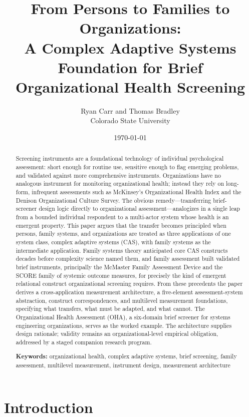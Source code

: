 \documentclass[12pt, letterpaper]{article}
\title{From Persons to Families to Organizations:\\A Complex Adaptive Systems Foundation for Brief Organizational Health Screening}
\author{Ryan Carr and Thomas Bradley\\Colorado State University}
\date{\today}
\begin{document}
\maketitle

\begin{abstract}
\noindent Screening instruments are a foundational technology of individual psychological assessment: short enough for routine use, sensitive enough to flag emerging problems, and validated against more comprehensive instruments. Organizations have no analogous instrument for monitoring organizational health; instead they rely on long-form, infrequent assessments such as McKinsey's Organizational Health Index and the Denison Organizational Culture Survey. The obvious remedy---transferring brief-screener design logic directly to organizational assessment---analogizes in a single leap from a bounded individual respondent to a multi-actor system whose health is an emergent property. This paper argues that the transfer becomes principled when persons, family systems, and organizations are treated as three applications of one system class, complex adaptive systems (CAS), with family systems as the intermediate application. Family systems theory anticipated core CAS constructs decades before complexity science named them, and family assessment built validated brief instruments, principally the McMaster Family Assessment Device and the SCORE family of systemic outcome measures, for precisely the kind of emergent relational construct organizational screening requires. From these precedents the paper derives a cross-application measurement architecture, a five-element assessment-system abstraction, construct correspondences, and multilevel measurement foundations, specifying what transfers, what must be adapted, and what cannot. The Organizational Health Assessment (OHA), a six-domain brief screener for systems engineering organizations, serves as the worked example. The architecture supplies design rationale; validity remains an organizational-level empirical obligation, addressed by a staged companion research program.

\vspace{0.75em}
\noindent\textbf{Keywords:} organizational health, complex adaptive systems, brief screening, family assessment, multilevel measurement, instrument design, measurement architecture
\end{abstract}

\section{Introduction}
\label{sec:introduction}
\end{document}
